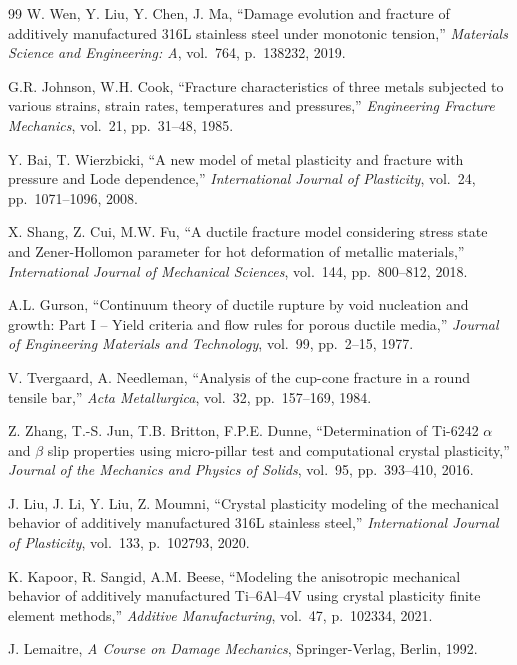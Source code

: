\begin{thebibliography}{99}
W. Wen, Y. Liu, Y. Chen, J. Ma, ``Damage evolution and fracture of additively manufactured 316L stainless steel under monotonic tension,'' \textit{Materials Science and Engineering: A}, vol.~764, p.~138232, 2019.

G.R. Johnson, W.H. Cook, ``Fracture characteristics of three metals subjected to various strains, strain rates, temperatures and pressures,'' \textit{Engineering Fracture Mechanics}, vol.~21, pp.~31--48, 1985.

Y. Bai, T. Wierzbicki, ``A new model of metal plasticity and fracture with pressure and Lode dependence,'' \textit{International Journal of Plasticity}, vol.~24, pp.~1071--1096, 2008.

X. Shang, Z. Cui, M.W. Fu, ``A ductile fracture model considering stress state and Zener-Hollomon parameter for hot deformation of metallic materials,'' \textit{International Journal of Mechanical Sciences}, vol.~144, pp.~800--812, 2018.

A.L. Gurson, ``Continuum theory of ductile rupture by void nucleation and growth: Part I -- Yield criteria and flow rules for porous ductile media,'' \textit{Journal of Engineering Materials and Technology}, vol.~99, pp.~2--15, 1977.

V. Tvergaard, A. Needleman, ``Analysis of the cup-cone fracture in a round tensile bar,'' \textit{Acta Metallurgica}, vol.~32, pp.~157--169, 1984.

Z. Zhang, T.-S. Jun, T.B. Britton, F.P.E. Dunne, ``Determination of Ti-6242 $\alpha$ and $\beta$ slip properties using micro-pillar test and computational crystal plasticity,'' \textit{Journal of the Mechanics and Physics of Solids}, vol.~95, pp.~393--410, 2016.

J. Liu, J. Li, Y. Liu, Z. Moumni, ``Crystal plasticity modeling of the mechanical behavior of additively manufactured 316L stainless steel,'' \textit{International Journal of Plasticity}, vol.~133, p.~102793, 2020.

K. Kapoor, R. Sangid, A.M. Beese, ``Modeling the anisotropic mechanical behavior of additively manufactured Ti--6Al--4V using crystal plasticity finite element methods,'' \textit{Additive Manufacturing}, vol.~47, p.~102334, 2021.

J. Lemaitre, \textit{A Course on Damage Mechanics}, Springer-Verlag, Berlin, 1992.


\end{thebibliography}
